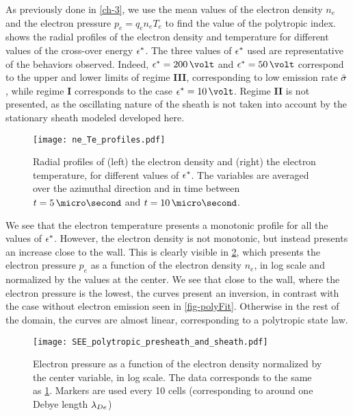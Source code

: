 As previously done in \cref{ch-3}, we use the mean values of the electron density $n_e$ and the electron pressure $ p_e = q_e n_e T_e$ to find the value of the polytropic index.
 shows the radial profiles of the electron density and temperature for different values of the cross-over energy $\epsilon^{*}$.
The three values of $\epsilon^{*}$ used are representative of the behaviors observed.
Indeed, $\crover=200\,\volt$ and $\crover=50\,\volt$ correspond to the upper and lower limits of regime {\bf III}, corresponding to low emission rate $ \bar{\sigma }$, while regime {\bf I} corresponds to the case $\crover=10\,\volt$.
Regime {\bf II} is not presented, as the oscillating nature of the sheath is not taken into account by the stationary sheath modeled developed here. 


\begin{figure}[!h]
  \centering
  \texttt{[image: ne\_Te\_profiles.pdf]}
  \caption{Radial profiles of (left) the electron density and (right) the electron temperature, for different values of $\epsilon^{*}$. The variables are averaged over the azimuthal direction and in time between $t=5\,\micro\second$ and $t=10\,\micro\second$.  }
  \label{fig-radial_profiles_see}
\end{figure}

We see that the electron temperature presents a monotonic profile for all the values of $\epsilon^{*}$.
However, the electron density is not monotonic, but instead presents an increase close to the wall.
This is clearly visible in \cref{fig-log_pe-ne}, which presents the electron pressure $p_e$ as a function of the electron density $n_e$, in log scale and normalized by the values at the center.
We see that close to the wall, where the electron pressure is the lowest, the curves present an inversion, in contrast with the case without electron emission seen in \cref{fig-polyFit}.
Otherwise in the rest of the domain, the curves are almost linear, corresponding to a polytropic state law.

\begin{figure}[!htb]
  \centering
  \texttt{[image: SEE\_polytropic\_presheath\_and\_sheath.pdf]}
  \caption{Electron pressure as a function of the electron density normalized by the center variable, in log scale. The data corresponds to the same as \cref{fig-radial_profiles_see}. Markers are used every 10 cells (corresponding to around one Debye length $\lambda_{De}$)}
  \label{fig-log_pe-ne}
\end{figure}

